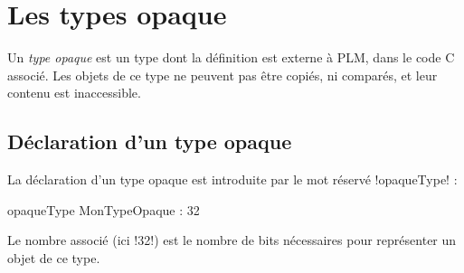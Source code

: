 




\chapter{Les types opaque}

Un \emph{type opaque} est un type dont la définition est externe à PLM, dans le code C associé. Les objets de ce type ne peuvent pas être copiés, ni comparés, et leur contenu est inaccessible. 

\section{Déclaration d'un type opaque}

La déclaration d'un type opaque est introduite par le mot réservé \plm!opaqueType! :

\begin{PLM}
opaqueType MonTypeOpaque : 32
\end{PLM}

Le nombre associé (ici \plm!32!) est le nombre de bits nécessaires pour représenter un objet de ce type.









